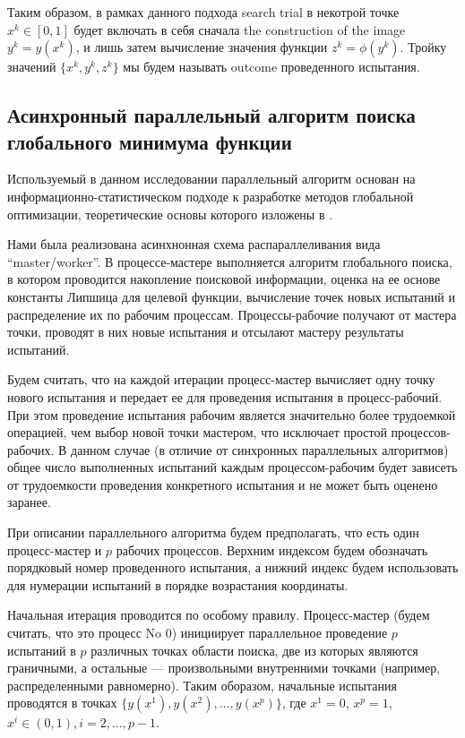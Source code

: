 \documentclass[mathematics,article,submit,pdftex,moreauthors]{Definitions/mdpi}
\begin{document}
Таким образом, в рамках данного подхода search trial в некотрой точке $x^k\in[0,1]$ будет включать в себя сначала the construction of the image $y^k=y(x^k)$, и лишь затем вычисление значения функции $ z^k = \phi(y^k)$.
Тройку значений $\{x^k,y^k,z^k\}$ мы будем называть outcome проведенного испытания.

\subsection{Асинхронный параллельный алгоритм поиска глобального минимума функции}

Используемый в данном исследовании параллельный алгоритм основан на информационно-статистическом подходе к разработке методов глобальной оптимизации, теоретические основы которого изложены в \cite{Strongin2000}. 

Нами была реализована асинхнонная схема распараллеливания вида ``master/worker''. В процессе-мастере выполняется алгоритм глобального поиска, в котором проводится накопление поисковой информации, оценка на ее основе константы Липшица для целевой функции, вычисление точек новых испытаний и распределение их по рабочим процессам. Процессы-рабочие получают от мастера точки, проводят в них новые испытания и отсылают мастеру результаты испытаний. 

Будем считать, что на каждой итерации процесс-мастер вычисляет одну точку нового испытания и передает ее для проведения испытания в процесс-рабочий. При этом проведение испытания рабочим является значительно более трудоемкой операцией, чем выбор новой точки мастером, что исключает простой процессов-рабочих. 
В данном случае (в отличие от синхронных параллельных алгоритмов) общее число выполненных испытаний каждым процессом-рабочим будет зависеть от трудоемкости проведения конкретного испытания и не может быть оценено заранее.

При описании параллельного алгоритма будем предполагать, что есть один процесс-мастер и $p$ рабочих процессов. Верхним индексом будем обозначать порядковый номер проведенного испытания, а нижний индекс будем использовать для нумерации испытаний в порядке возрастания координаты.
 
Начальная итерация проводится по особому правилу. Процесс-мастер (будем считать, что это процесс No 0) инициирует параллельное проведение $p$ испытаний в $p$ различных точках области поиска, две из которых являются граничными, а остальные --- произвольными внутренними точками (например, распределенными равномерно). Таким оборазом, начальные испытания проводятся в точках $\{y(x^1), y(x^2), ...,y(x^p)\}$, где $x^1 = 0$, $x^p = 1$, $x^i\in(0,1), i=2,..., p-1$.
\end{document}
